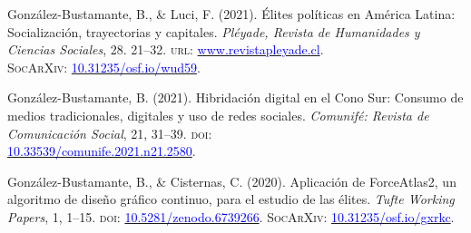 \begin{publications}
\begin{benumerate}{14}
\item{González-Bustamante, B., \& Luci, F. (2021). Élites políticas en América Latina: Socialización, trayectorias y capitales. {\itshape Pléyade, Revista de Humanidades y Ciencias Sociales}, 28. 21--32. {\scshape url:} \href{http://www.revistapleyade.cl/index.php/OJS/article/view/359}{\textcolor{blue}{www.revistapleyade.cl}}. \\ {\scshape \footnotesize SocArXiv:} \href{https://doi.org/10.31235/osf.io/wud59}{\textcolor{blue}{10.31235/osf.io/wud59}}.}\vspace{1mm}


\item{González-Bustamante, B. (2021).  Hibridación digital en el Cono Sur: Consumo de medios tradicionales, digitales y uso de redes sociales. {\itshape Comunifé: Revista de Comunicación Social}, 21, 31--39. {\scshape doi:} \\ \href{https://doi.org/10.33539/comunife.2021.n21.2580}{\textcolor{blue}{10.33539/comunife.2021.n21.2580}}.}\vspace{1mm} %


\item{González-Bustamante, B., \& Cisternas, C. (2020). Aplicación de ForceAtlas2, un algoritmo de diseño gráfico continuo, para el estudio de las élites. {\itshape Tufte Working Papers}, 1, 1--15. {\scshape doi:} \href{https://doi.org/10.5281/zenodo.6739266}{\textcolor{blue}{10.5281/zenodo.6739266}}. {\scshape \footnotesize SocArXiv:} \href{https://doi.org/10.31235/osf.io/gxrkc}{\textcolor{blue}{10.31235/osf.io/gxrkc}}.}\vspace{1mm}


\end{benumerate}
\end{publications}
